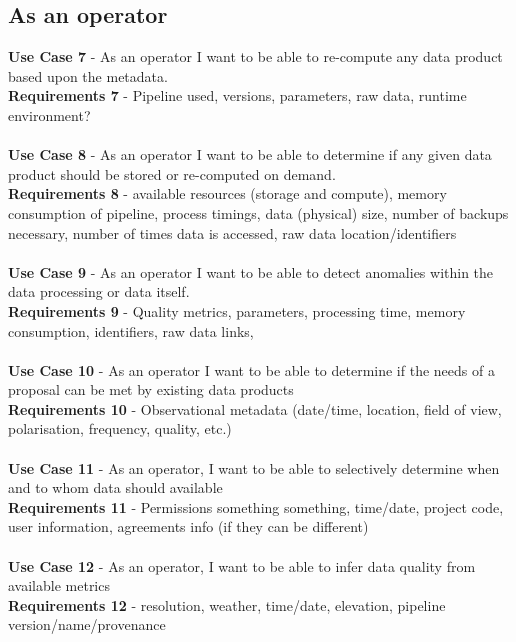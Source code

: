 \subsection{As an operator}
{\bf Use Case 7} - As an operator I want to be able to re-compute any data product based upon the metadata. 
\\
{\bf Requirements 7} - Pipeline used, versions, parameters, raw data, runtime environment?
\\\\
{\bf Use Case 8} - As an operator I want to be able to determine if any given data product should be stored or re-computed on demand. 
\\
{\bf Requirements 8} - available resources (storage and compute), memory consumption of pipeline, process timings, data (physical) size, number of backups necessary, number of times data is accessed, raw data location/identifiers
\\\\
{\bf Use Case 9} - As an operator I want to be able to detect anomalies within the data processing or data itself. 
\\
{\bf Requirements 9} - Quality metrics, parameters, processing time, memory consumption, identifiers, raw data links, 
\\\\
{\bf Use Case 10} - As an operator I want to be able to determine if the needs of a proposal can be met by existing data products
\\
{\bf Requirements 10} - Observational metadata (date/time, location, field of view, polarisation, frequency, quality, etc.)
\\\\
{\bf Use Case 11} - As an operator, I want to be able to selectively determine when and to whom data should available 
\\
{\bf Requirements 11} - Permissions something something, time/date, project code, user information, agreements info (if they can be different)
\\\\
{\bf Use Case 12} - As an operator, I want to be able to infer data quality from available metrics
\\
{\bf Requirements 12} - resolution, weather, time/date, elevation, pipeline version/name/provenance
\\\\

